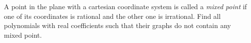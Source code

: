 A point in the plane with a cartesian coordinate system is called a \emph{mixed point} if one of its coordinates is rational and the other one is irrational. Find all polynomials with real coefficients such that their graphs do not contain any mixed point.